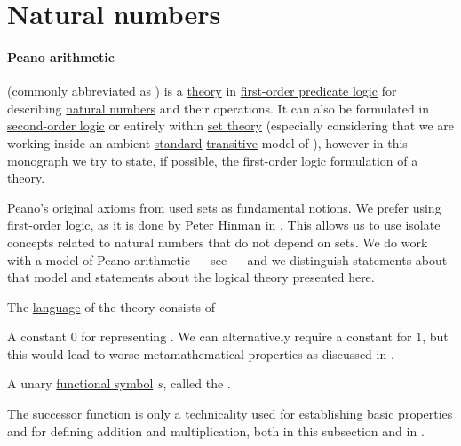 \section{Natural numbers}\label{sec:natural_numbers}

\paragraph{Peano arithmetic}

\begin{definition}\label{def:peano_arithmetic}
   (commonly abbreviated as ) is a \hyperref[def:first_order_theory]{theory} in \hyperref[sec:first_order_logic]{first-order predicate logic} for describing \hyperref[def:natural_numbers]{natural numbers} and their operations. It can also be formulated in \hyperref[def:simply_typed_hol]{second-order logic} or entirely within \hyperref[ch:set_theory]{set theory} (especially considering that we are working inside an ambient \hyperref[rem:standard_model_of_set_theory]{standard} \hyperref[rem:transitive_model_of_set_theory]{transitive} model of \hyperref[def:axiom_of_universes]{}), however in this monograph we try to state, if possible, the first-order logic formulation of a theory.

  Peano's original axioms from \cite[1]{Peano1889PA} used sets as fundamental notions. We prefer using first-order logic, as it is done by Peter Hinman in . This allows us to use isolate concepts related to natural numbers that do not depend on sets. We do work with a model of Peano arithmetic --- see  --- and we distinguish statements about that model and statements about the logical theory presented here.

  The \hyperref[def:first_order_language]{language} of the theory consists of
  \begin{thmenum}[series=def:peano_arithmetic]
     A constant \( 0 \) for representing . We can alternatively require a constant for \( 1 \), but this would lead to worse metamathematical properties as discussed in .

     A unary \hyperref[def:first_order_language/fun]{functional symbol} \( s \), called the .

    The successor function is only a technicality used for establishing basic properties and for defining addition and multiplication, both in this subsection and in .


\end{thmenum}
\end{definition}
